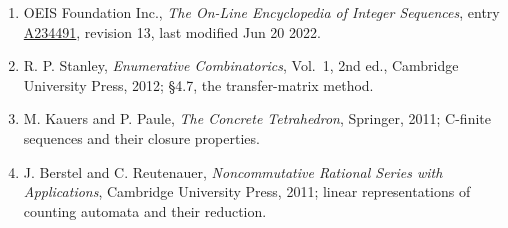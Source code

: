 \documentclass[11pt]{article}
\theoremstyle{definition}
\begin{document}
\begin{enumerate}

\item OEIS Foundation Inc., \emph{The On-Line Encyclopedia of Integer Sequences}, entry \href{https://oeis.org/A234491}{A234491}, revision 13, last modified Jun 20 2022.

\item R. P. Stanley, \emph{Enumerative Combinatorics}, Vol.~1, 2nd ed., Cambridge University Press, 2012; \S4.7, the transfer-matrix method.

\item M. Kauers and P. Paule, \emph{The Concrete Tetrahedron}, Springer, 2011; C-finite sequences and their closure properties.

\item J. Berstel and C. Reutenauer, \emph{Noncommutative Rational Series with Applications}, Cambridge University Press, 2011; linear representations of counting automata and their reduction.

\end{enumerate}
\end{document}

